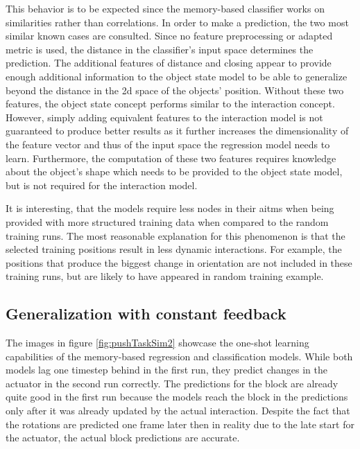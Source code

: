 This behavior is to be expected since the memory-based classifier works on similarities rather than correlations. In order to make a prediction, the two most similar known cases are consulted. Since no feature preprocessing or adapted metric is used, the distance in the classifier's input space determines the prediction. The additional features of distance and closing appear to provide enough additional information to the object state model to be able to generalize beyond the distance in the 2d space of the objects' position. Without these two features, the object state concept performs similar to the interaction concept.
However, simply adding equivalent features to the interaction model is not guaranteed to produce better results as it further increases the dimensionality of the feature vector and thus of the input space the regression model needs to learn. Furthermore, the computation of these two features requires knowledge about the object's shape which needs to be provided to the object state model, but is not required for the interaction model.

It is interesting, that the models require less nodes in their \glspl{aitm} when being provided with more structured training data when compared to the random training runs.
The most reasonable explanation for this phenomenon is that the selected training positions result in less dynamic interactions. For example, the positions that produce the biggest change in orientation are not included in these training runs, but are likely to have appeared in random training example.  


\subsection{Generalization with constant feedback} 

The images in figure \ref{fig:pushTaskSim2} showcase the one-shot learning capabilities of the memory-based regression and classification models. While both models lag one timestep behind in the first run, they predict changes in the actuator in the second run correctly.
The predictions for the block are already quite good in the first run because the models reach the block in the predictions only after it was already updated by the actual interaction. Despite the fact that the rotations are predicted one frame later then in reality due to the late start for the actuator, the actual block predictions are accurate.

